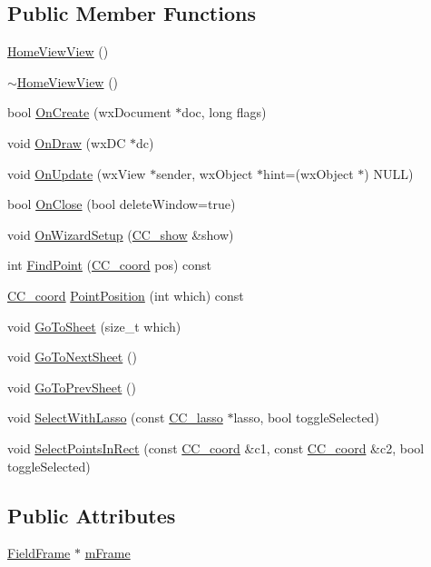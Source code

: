 \subsection*{Public Member Functions}
\begin{DoxyCompactItemize}
\item 
\hyperlink{a00108_ac65bd1ed9886559948fdbaf19efda565}{Home\-View\-View} ()
\item 
\hyperlink{a00108_a2596ceb0c0507c99ce50861c0f96cc3c}{$\sim$\-Home\-View\-View} ()
\item 
bool \hyperlink{a00108_aa28027d68c76a89d29e6ec936272a0ad}{On\-Create} (wx\-Document $\ast$doc, long flags)
\item 
void \hyperlink{a00108_a1f3eb01bbe0f236568aff25178627921}{On\-Draw} (wx\-D\-C $\ast$dc)
\item 
void \hyperlink{a00108_a1c6f370fc1dca3b55b60a65679c62e9f}{On\-Update} (wx\-View $\ast$sender, wx\-Object $\ast$hint=(wx\-Object $\ast$) N\-U\-L\-L)
\item 
bool \hyperlink{a00108_a61272d75373d210c9653ccd14acc023a}{On\-Close} (bool delete\-Window=true)
\item 
void \hyperlink{a00108_a053ea1b0c4c29c3ef93930fb67d9a52c}{On\-Wizard\-Setup} (\hyperlink{a00046}{C\-C\-\_\-show} \&show)
\item 
int \hyperlink{a00108_a900f32636a8d2b687d9a5a142730d6a6}{Find\-Point} (\hyperlink{a00029}{C\-C\-\_\-coord} pos) const 
\item 
\hyperlink{a00029}{C\-C\-\_\-coord} \hyperlink{a00108_a01129395b0d61e043564db4a6a80712d}{Point\-Position} (int which) const 
\item 
void \hyperlink{a00108_ad1b42a98766635033b5df063d3577e03}{Go\-To\-Sheet} (size\-\_\-t which)
\item 
void \hyperlink{a00108_a1349568939fbc5e160cbc325c164adde}{Go\-To\-Next\-Sheet} ()
\item 
void \hyperlink{a00108_a8f09ccc780f81eb6920ae16fbae9eec7}{Go\-To\-Prev\-Sheet} ()
\item 
void \hyperlink{a00108_a1d04faa0f206b29563e945d02f23f7e5}{Select\-With\-Lasso} (const \hyperlink{a00033}{C\-C\-\_\-lasso} $\ast$lasso, bool toggle\-Selected)
\item 
void \hyperlink{a00108_a50b7e46530f36f0e8731035b40ac7704}{Select\-Points\-In\-Rect} (const \hyperlink{a00029}{C\-C\-\_\-coord} \&c1, const \hyperlink{a00029}{C\-C\-\_\-coord} \&c2, bool toggle\-Selected)
\end{DoxyCompactItemize}
\subsection*{Public Attributes}
\begin{DoxyCompactItemize}
\item 
\hyperlink{a00102}{Field\-Frame} $\ast$ \hyperlink{a00108_acfb8f64c0cf233acc390a6c33840dec9}{m\-Frame}
\end{DoxyCompactItemize}
